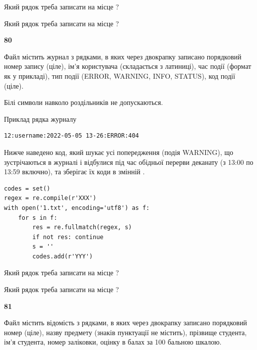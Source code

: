 Який рядок треба записати на місце  ?\par
\vspace{5mm}


Який рядок треба записати на місце  ?\par


\newpage

{\begin {center}\textbf{ 80}\end {center}}\par
Файл  містить журнал з рядками, в яких через двокрапку записано поряд\-ко\-вий номер запису (ціле), ім'я користувача (складається з латиниці), час події (фор\-мат як у прикладі), тип події (ERROR, WARNING, INFO, STATUS), код події (ціле).

Білі символи навколо роздільників не допускаються.

Приклад рядка журналу



\begin{verbatim}
12:username:2022-05-05 13-26:ERROR:404
\end{verbatim}


Нижче наведено код, який шукає усі попередження (подія WARNING), що зустрі\-ча\-ються в журналі і відбулися під час обідньої перерви деканату (з 13:00 по 13:59 включно), та зберігає їх коди в змінній .



\begin{verbatim}
codes = set()
regex = re.compile(r'XXX')
with open('1.txt', encoding='utf8') as f:
    for s in f:
        res = re.fullmatch(regex, s)
        if not res: continue
        s = ''
        codes.add(r'YYY')
\end{verbatim}







Який рядок треба записати на місце  ?\par
\vspace{5mm}


Який рядок треба записати на місце  ?\par


\newpage

{\begin {center}\textbf{ 81}\end {center}}\par
Файл  містить відомість з рядками, в яких через двокрапку записано поряд\-ковий номер (ціле), назву предмету (знаків пунктуації не містить), прізвище студента, ім'я студента, номер заліковки, оцінку в балах за 100 бальною шкалою.

